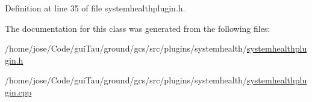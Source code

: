 Definition at line 35 of file systemhealthplugin.\-h.



The documentation for this class was generated from the following files\-:\begin{DoxyCompactItemize}
\item 
/home/jose/\-Code/gui\-Tau/ground/gcs/src/plugins/systemhealth/\hyperlink{systemhealthplugin_8h}{systemhealthplugin.\-h}\item 
/home/jose/\-Code/gui\-Tau/ground/gcs/src/plugins/systemhealth/\hyperlink{systemhealthplugin_8cpp}{systemhealthplugin.\-cpp}\end{DoxyCompactItemize}

